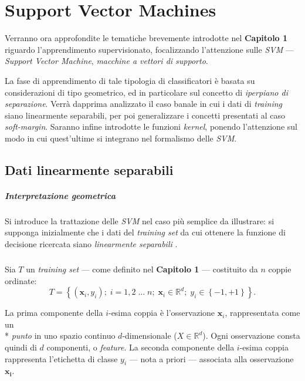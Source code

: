 %

\chapter{Support Vector Machines}

Verranno ora approfondite le tematiche brevemente introdotte nel \textbf{Capitolo 1} riguardo l'apprendimento supervisionato, focalizzando l'attenzione sulle \textit{SVM} --- \textit{Support Vector Machine}, \textit{macchine a vettori di supporto}.

La fase di apprendimento di tale tipologia di classificatori è basata su considerazioni di tipo geometrico, ed in particolare sul concetto di \textit{iperpiano di separazione}.
Verrà dapprima analizzato il caso banale in cui i dati di \textit{training} siano linearmente separabili, per poi generalizzare i concetti presentati al caso \textit{soft-margin}. Saranno infine introdotte le funzioni \textit{kernel}, ponendo l'attenzione sul modo in cui quest'ultime si integrano nel formalismo delle \textit{SVM}.

\section{Dati linearmente separabili}

\paragraph{Interpretazione geometrica}
Si introduce la trattazione delle \textit{SVM} nel caso più semplice da illustrare: si supponga inizialmente che i dati del \textit{training set} da cui ottenere la funzione di decisione ricercata siano \textit{linearmente separabili} \cite{vapnik}.

\paragraph{}
Sia $T$ un \textit{training set} --- come definito nel \textbf{Capitolo 1} --- costituito da $n$ coppie ordinate:
\begin{equation}
T = \left\{ { (\boldsymbol{x}_i, y_i);\; i = 1, 2 \;...\; n;\; \boldsymbol{x}_i \in \mathbb{R}^d; \; y_i \in \left\{-1, +1\right\} }\right\}.
\end{equation}

La prima componente della $i$-esima coppia è l'osservazione $\boldsymbol{x}_i$, rappresentata come un \\* \textit{punto} in uno spazio continuo $d$-dimensionale ($X \in \mathbb{R}^d$). Ogni osservazione consta quindi di $d$ componenti, o \textit{feature}. La seconda componente della $i$-esima coppia rappresenta l'etichetta di classe $y_i$ --- nota a priori --- associata alla osservazione $\boldsymbol{x_i}$. 

